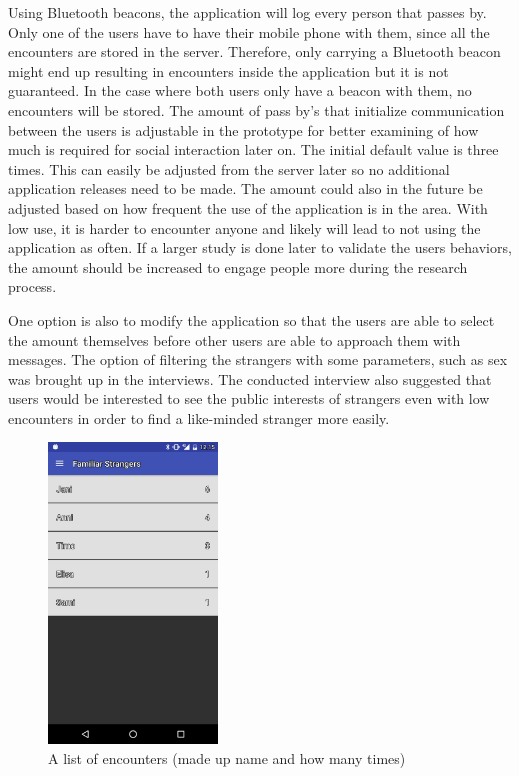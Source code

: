 Using Bluetooth beacons, the application will log every person that passes by. Only one of the users have to have their mobile phone with them, since all the encounters are stored in the server. Therefore, only carrying a Bluetooth beacon might end up resulting in encounters inside the application but it is not guaranteed. In the case where both users only have a beacon with them, no encounters will be stored. The amount of pass by's that initialize communication between the users is adjustable in the prototype for better examining of how much is required for social interaction later on. The initial default value is three times. This can easily be adjusted from the server later so no additional application releases need to be made. The amount could also in the future be adjusted based on how frequent the use of the application is in the area. With low use, it is harder to encounter anyone and likely will lead to not using the application as often. If a larger study is done later to validate the users behaviors, the amount should be increased to engage people more during the research process.

One option is also to modify the application so that the users are able to select the amount themselves before other users are able to approach them with messages. The option of filtering the strangers with some parameters, such as sex was brought up in the interviews. The conducted interview also suggested that users would be interested to see the public interests of strangers even with low encounters in order to find a like-minded stranger more easily.

\begin{figure}[htb]
	\begin{center}
		\includegraphics[width=0.4\textwidth]{encounters.png}
		\caption{A list of encounters (made up name and how many times)}	
		\label{fig:encounters}
	\end{center}
\end{figure}


